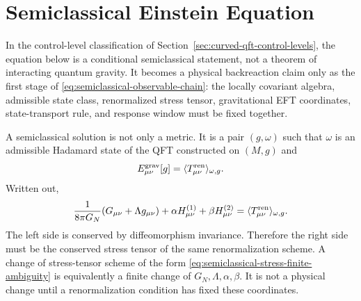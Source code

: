 \section{Semiclassical Einstein Equation}

In the control-level classification of
Section~\ref{sec:curved-qft-control-levels}, the equation below is a
conditional semiclassical statement, not a theorem of interacting quantum
gravity.  It becomes a physical backreaction claim only as the first stage of
\eqref{eq:semiclassical-observable-chain}: the locally covariant algebra,
admissible state class, renormalized stress tensor, gravitational EFT
coordinates, state-transport rule, and response window must be fixed together.

A semiclassical solution is not only a metric.  It is a pair \((g,\omega)\)
such that \(\omega\) is an admissible Hadamard state of the QFT constructed
on \((M,g)\) and
\begin{equation}
  E_{\mu\nu}^{\rm grav}[g]
  =
  \langle T_{\mu\nu}^{\rm ren}\rangle_{\omega,g}.
  \label{eq:semiclassical-einstein-equation-expanded}
\end{equation}
Written out,
\begin{equation}
  \frac1{8\pi G_N}(G_{\mu\nu}+\Lambda g_{\mu\nu})
  +
  \alpha H^{(1)}_{\mu\nu}
  +
  \beta H^{(2)}_{\mu\nu}
  =
  \langle T_{\mu\nu}^{\rm ren}\rangle_{\omega,g}.
  \label{eq:semiclassical-einstein-equation}
\end{equation}
The left side is conserved by diffeomorphism invariance.  Therefore the
right side must be the conserved stress tensor of the same renormalization
scheme.  A change of stress-tensor scheme of the form
\eqref{eq:semiclassical-stress-finite-ambiguity} is equivalently a finite
change of \(G_N,\Lambda,\alpha,\beta\).  It is not a physical change until a
renormalization condition has fixed these coordinates.

